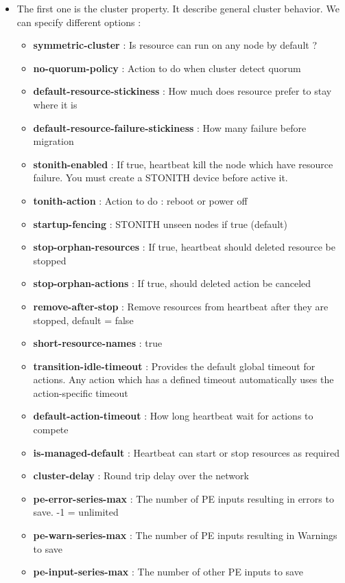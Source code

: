 \documentclass[a4paper,10pt]{report}
\begin{document}
\begin{itemize}
\item The first one is the cluster property. It describe general cluster behavior. We can specify different options :

\begin{itemize}
\item \textbf{symmetric-cluster} : Is resource can run on any node by default ?
\item \textbf{no-quorum-policy} : Action to do when cluster detect quorum
\item \textbf{default-resource-stickiness} : How much does resource prefer to stay where it is
\item \textbf{default-resource-failure-stickiness} : How many failure before migration
\item \textbf{stonith-enabled} : If true, heartbeat kill the node which have resource failure. You must create a STONITH device before active it.
\item \textbf{tonith-action} : Action to do : reboot or power off
\item \textbf{startup-fencing} : STONITH unseen nodes if true (default)
\item \textbf{stop-orphan-resources} : If true, heartbeat should deleted resource be stopped
\item \textbf{stop-orphan-actions} : If true, should deleted action be canceled
\item \textbf{remove-after-stop} : Remove resources from heartbeat after they are stopped, default = false
\item \textbf{short-resource-names} : true
\item \textbf{transition-idle-timeout} : Provides the default global timeout for actions. Any action which has a defined timeout automatically
uses the action-specific timeout
\item \textbf{default-action-timeout} : How long heartbeat wait for actions to compete
\item \textbf{is-managed-default} : Heartbeat can start or stop resources as required
\item \textbf{cluster-delay} : Round trip delay over the network
\item \textbf{pe-error-series-max} : The number of PE inputs resulting in errors to save. -1 = unlimited
\item \textbf{pe-warn-series-max} : The number of PE inputs resulting in Warnings to save
\item \textbf{pe-input-series-max} : The number of other PE inputs to save
\end{itemize}


\end{itemize}
\end{document}
